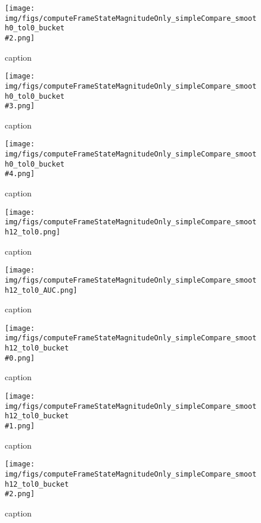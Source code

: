 %
\begin{figure}[!ht]
	\centering
	\texttt{[image: img/figs/computeFrameStateMagnitudeOnly\_simpleCompare\_smooth0\_tol0\_bucket\\\#2.png]}
	\caption{caption}
	\label{fig:computeFrameStateMagnitudeOnly_simpleCompare_smooth0_tol0_bucket\#2.png}
\end{figure}
%
\begin{figure}[!ht]
	\centering
	\texttt{[image: img/figs/computeFrameStateMagnitudeOnly\_simpleCompare\_smooth0\_tol0\_bucket\\\#3.png]}
	\caption{caption}
	\label{fig:computeFrameStateMagnitudeOnly_simpleCompare_smooth0_tol0_bucket\#3.png}
\end{figure}
%
\begin{figure}[!ht]
	\centering
	\texttt{[image: img/figs/computeFrameStateMagnitudeOnly\_simpleCompare\_smooth0\_tol0\_bucket\\\#4.png]}
	\caption{caption}
	\label{fig:computeFrameStateMagnitudeOnly_simpleCompare_smooth0_tol0_bucket\#4.png}
\end{figure}
%
\begin{figure}[!ht]
	\centering
	\texttt{[image: img/figs/computeFrameStateMagnitudeOnly\_simpleCompare\_smooth12\_tol0.png]}
	\caption{caption}
	\label{fig:computeFrameStateMagnitudeOnly_simpleCompare_smooth12_tol0.png}
\end{figure}
%
\begin{figure}[!ht]
	\centering
	\texttt{[image: img/figs/computeFrameStateMagnitudeOnly\_simpleCompare\_smooth12\_tol0\_AUC.png]}
	\caption{caption}
	\label{fig:computeFrameStateMagnitudeOnly_simpleCompare_smooth12_tol0_AUC.png}
\end{figure}
%
\begin{figure}[!ht]
	\centering
	\texttt{[image: img/figs/computeFrameStateMagnitudeOnly\_simpleCompare\_smooth12\_tol0\_bucket\\\#0.png]}
	\caption{caption}
	\label{fig:computeFrameStateMagnitudeOnly_simpleCompare_smooth12_tol0_bucket\#0.png}
\end{figure}
%
\begin{figure}[!ht]
	\centering
	\texttt{[image: img/figs/computeFrameStateMagnitudeOnly\_simpleCompare\_smooth12\_tol0\_bucket\\\#1.png]}
	\caption{caption}
	\label{fig:computeFrameStateMagnitudeOnly_simpleCompare_smooth12_tol0_bucket\#1.png}
\end{figure}
%
\begin{figure}[!ht]
	\centering
	\texttt{[image: img/figs/computeFrameStateMagnitudeOnly\_simpleCompare\_smooth12\_tol0\_bucket\\\#2.png]}
	\caption{caption}
	\label{fig:computeFrameStateMagnitudeOnly_simpleCompare_smooth12_tol0_bucket\#2.png}
\end{figure}

